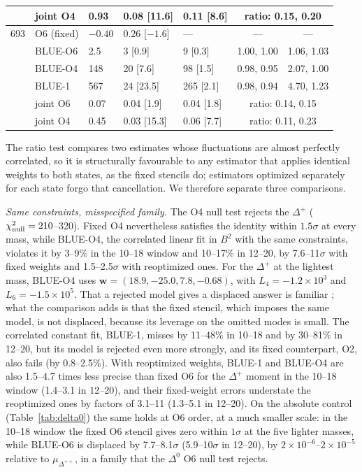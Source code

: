 \documentclass[aps,prd,preprint,nofootinbib,floatfix]{revtex4-2}
\begin{document}
\begin{table}[t]
\begin{tabular}{cllllcc}
    & joint O4 & 0.93 & 0.08 [11.6] & 0.11 [8.6] & \multicolumn{2}{c}{ratio: 0.15, 0.20}\\
\midrule
693 & O6 (fixed) & $-0.40$ & 0.26 [$-1.6$] & --- & --- & ---\\
    & BLUE-O6 & 2.5 & 3 [0.9] & 9 [0.3] & 1.00, 1.00 & 1.06, 1.03\\
    & BLUE-O4 & 148 & 20 [7.6] & 98 [1.5] & 0.98, 0.95 & 2.07, 1.00\\
    & BLUE-1 & 567 & 24 [23.5] & 265 [2.1] & 0.98, 0.94 & 4.70, 1.23\\
    & joint O6 & 0.07 & 0.04 [1.9] & 0.04 [1.8] & \multicolumn{2}{c}{ratio: 0.14, 0.15}\\
    & joint O4 & 0.45 & 0.03 [15.3] & 0.06 [7.7] & \multicolumn{2}{c}{ratio: 0.11, 0.23}\\
\bottomrule
\end{tabular}
\end{table}

The ratio test compares two estimates whose fluctuations are almost perfectly correlated, so it is structurally favourable to any estimator that applies identical weights to both states, as the fixed stencils do; estimators optimized separately for each state forgo that cancellation. We therefore separate three comparisons.

\emph{Same constraints, misspecified family.} The O4 null test rejects the $\Delta^+$ ($\chi^2_{\rm null}=210$--320). Fixed O4 nevertheless satisfies the identity within $1.5\sigma$ at every mass, while BLUE-O4, the correlated linear fit in $B^2$ with the same constraints, violates it by 3--9\% in the 10--18 window and 10--17\% in 12--20, by 7.6--11$\sigma$ with fixed weights and 1.5--2.5$\sigma$ with reoptimized ones. For the $\Delta^+$ at the lightest mass, BLUE-O4 uses $\bm w=(18.9,-25.0,7.8,-0.68)$, with $L_4=-1.2\times10^3$ and $L_6=-1.5\times10^5$. That a rejected model gives a displaced answer is familiar \cite{DAgostini1994}; what the comparison adds is that the fixed stencil, which imposes the same model, is not displaced, because its leverage on the omitted modes is small. The correlated constant fit, BLUE-1, misses by 11--48\% in 10--18 and by 30--81\% in 12--20, but its model is rejected even more strongly, and its fixed counterpart, O2, also fails (by 0.8--2.5\%). With reoptimized weights, BLUE-1 and BLUE-O4 are also 1.5--4.7 times less precise than fixed O6 for the $\Delta^+$ moment in the 10--18 window (1.4--3.1 in 12--20), and their fixed-weight errors understate the reoptimized ones by factors of 3.1--11 (1.3--5.1 in 12--20). On the absolute control (Table~\ref{tab:delta0}) the same holds at O6 order, at a much smaller scale: in the 10--18 window the fixed O6 stencil gives zero within $1\sigma$ at the five lighter masses, while BLUE-O6 is displaced by 7.7--8.1$\sigma$ (5.9--10$\sigma$ in 12--20), by $2\times10^{-6}$--$2\times10^{-5}$ relative to $\mu_{\Delta^{++}}$, in a family that the $\Delta^0$ O6 null test rejects.
\end{document}
